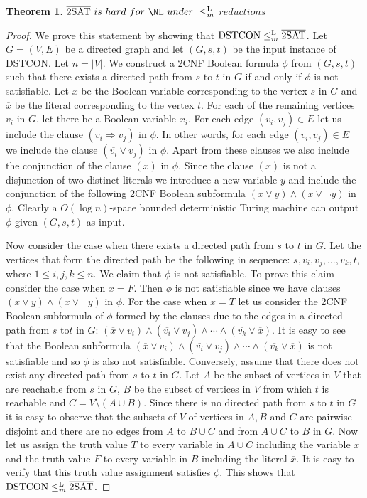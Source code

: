 \documentclass{amsbook}
\newtheorem{theorem}{Theorem}[chapter]
\theoremstyle{definition}
\theoremstyle{remark}
\numberwithin{section}{chapter}
\numberwithin{equation}{chapter}
\newcommand{\Lredn}{\leq^{\small{\rm L}}_m}
\begin{document}
\begin{theorem}\label{chap2-2SATisNLhard}
{$\overline{\rm 2SAT}~{is~hard~for~\NL}~{under~\Lredn}~$${reductions}$}
\end{theorem}
\begin{proof}
We prove this statement by showing that ${\rm DSTCON}\Lredn\overline{\rm 2SAT}$. Let $G=(V,E)$ be a directed graph and let $(G,s,t)$ be the input instance of DSTCON. Let $n=|V|$. We construct a 2CNF Boolean formula $\phi$ from $(G,s,t)$ such that there exists a directed path from $s$ to $t$ in $G$ if and only if $\phi$ is not satisfiable. Let $x$ be the Boolean variable corresponding to the vertex $s$ in $G$ and $\overline{x}$ be the literal corresponding to the vertex $t$. For each of the remaining vertices $v_i$ in $G$, let there be a Boolean variable $x_i$. For each edge $(v_i,v_j)\in E$ let us include the clause $(v_i\Rightarrow v_j)$ in $\phi$. In other words, for each edge $(v_i,v_j)\in E$ we include the clause $(\overline{v_i}\vee v_j)$ in $\phi$. Apart from these clauses we also include the conjunction of the clause $(x)$ in $\phi$. Since the clause $(x)$ is not a disjunction of two distinct literals we introduce a new variable $y$ and include the conjunction of the following 2CNF Boolean subformula $(x\vee y)\wedge (x\vee \neg y)$ in $\phi$. Clearly a $O(\log n)$-space bounded deterministic Turing machine can output $\phi$ given $(G,s,t)$ as input.

Now consider the case when there exists a directed path from $s$ to $t$ in $G$. Let the vertices that form the directed path be the following in sequence: $s,v_i,v_j,\ldots ,v_k,t$, where $1\leq i,j,k\leq n$. We claim that $\phi$ is not satisfiable. To prove this claim consider the case when $x=F$. Then $\phi$ is not satisfiable since we have clauses $(x\vee y)\wedge (x\vee \neg y)$ in $\phi$. For the case when $x=T$ let us consider the 2CNF Boolean subformula of $\phi$ formed by the clauses due to the edges in a directed path from $s$ to$t$ in $G$: $(\overline{x}\vee v_i)\wedge (\overline{v_i}\vee v_j)\wedge\cdots\wedge (\overline{v_k}\vee \overline{x})$. It is easy to see that the Boolean subformula $(\overline{x}\vee v_i)\wedge (\overline{v_i}\vee v_j)\wedge\cdots\wedge (\overline{v_k}\vee \overline{x})$ is not satisfiable and so $\phi$ is also not satisfiable. Conversely, assume that there does not exist any directed path from $s$ to $t$ in $G$. Let $A$ be the subset of vertices in $V$ that are reachable from $s$ in $G$, $B$ be the subset of vertices in $V$ from which $t$ is reachable and $C=V\setminus (A\cup B)$. Since there is no directed path from $s$ to $t$ in $G$ it is easy to observe that the subsets of $V$ of vertices in $A,B$ and $C$ are pairwise disjoint and there are no edges from $A$ to $B\cup C$ and from $A\cup C$ to $B$ in $G$. Now let us assign the truth value $T$ to every variable in $A\cup C$ including the variable $x$ and the truth value $F$ to every variable in $B$ including the literal $\overline{x}$. It is easy to verify that this truth value assignment satisfies $\phi$. This shows that ${\rm DSTCON}\Lredn\overline{\rm 2SAT}$.
\end{proof}
\end{document}
